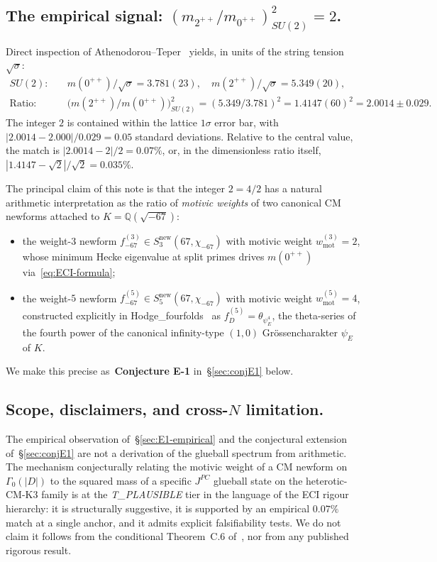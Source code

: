 \documentclass[11pt,a4paper]{amsart}
\theoremstyle{definition}
\begin{document}
\subsection*{The empirical signal: $(m_{2^{++}}/m_{0^{++}})^{2}_{SU(2)} = 2$.}
Direct inspection of Athenodorou--Teper~\cite[Table~34]{AthenodorouTeper2021}
yields, in units of the string tension $\sqrt{\sigma}$:
\begin{align*}
SU(2): \quad& m(0^{++})/\sqrt{\sigma} = 3.781(23), \quad m(2^{++})/\sqrt{\sigma} = 5.349(20), \\
\text{Ratio:} \quad& \bigl(m(2^{++})/m(0^{++})\bigr)^{2}_{SU(2)} = (5.349 / 3.781)^{2} = 1.4147(60)^{2} = 2.0014 \pm 0.029.
\end{align*}
The integer $2$ is contained within the lattice $1\sigma$ error bar, with
$|2.0014 - 2.000| / 0.029 = 0.05$ standard deviations.
Relative to the central value, the match is $|2.0014 - 2| / 2 = 0.07\%$, or, in
the dimensionless ratio itself, $|1.4147 - \sqrt{2}| / \sqrt{2} = 0.035\%$.

The principal claim of this note is that the integer $2 = 4/2$ has a natural
arithmetic interpretation as the ratio of \emph{motivic weights} of two canonical
CM newforms attached to $K = \mathbb{Q}(\sqrt{-67})$:
\begin{itemize}\setlength\itemsep{2pt}
\item the weight-$3$ newform $f_{-67}^{(3)} \in S_{3}^{\mathrm{new}}(67, \chi_{-67})$
      with motivic weight $w_{\mathrm{mot}}^{(3)} = 2$, whose minimum Hecke
      eigenvalue at split primes drives $m(0^{++})$ via~\eqref{eq:ECI-formula};
\item the weight-$5$ newform $f_{-67}^{(5)} \in S_{5}^{\mathrm{new}}(67, \chi_{-67})$
      with motivic weight $w_{\mathrm{mot}}^{(5)} = 4$, constructed explicitly in
      Hodge\_fourfolds~\cite[\S2.2]{HodgeFourfolds} as
      $f_{D}^{(5)} = \theta_{\psi_{E}^{4}}$, the theta-series of the fourth
      power of the canonical infinity-type $(1, 0)$ Grössencharakter $\psi_{E}$
      of $K$.
\end{itemize}
We make this precise as~\textbf{Conjecture E-1} in~\S\ref{sec:conjE1} below.

\subsection*{Scope, disclaimers, and cross-$N$ limitation.}
The empirical observation of~\S\ref{sec:E1-empirical} and the conjectural
extension of~\S\ref{sec:conjE1} are not a derivation of the glueball spectrum
from arithmetic. The mechanism conjecturally relating the motivic weight of a
CM newform on $\Gamma_{0}(|D|)$ to the squared mass of a specific $J^{PC}$
glueball state on the heterotic-CM-$\mathrm{K3}$ family is at the
\emph{T\_PLAUSIBLE} tier in the language of the ECI rigour hierarchy: it is
structurally suggestive, it is supported by an empirical $0.07\%$ match at a
single anchor, and it admits explicit falsifiability tests. We do not claim it
follows from the conditional Theorem~C.6 of~\cite{ThmC6FN}, nor from any
published rigorous result.
\end{document}
